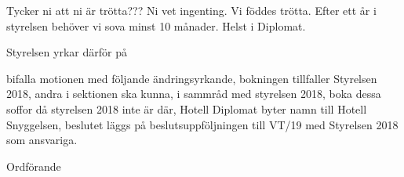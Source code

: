 \documentclass[../_main/handlingar.tex]{subfiles}
\begin{document}
\motionssvar
Tycker ni att ni är trötta??? Ni vet ingenting. Vi föddes trötta. Efter ett år i styrelsen behöver vi sova minst 10 månader. Helst i Diplomat.

Styrelsen yrkar därför på

\begin{attsatser}
	\att bifalla motionen med följande ändringsyrkande,
	\att bokningen tillfaller Styrelsen 2018,
	\att andra i sektionen ska kunna, i sammråd med styrelsen 2018, boka dessa
  soffor då styrelsen 2018 inte är där,
  \att Hotell Diplomat byter namn till Hotell Snyggelsen,
  \att beslutet läggs på beslutsuppföljningen till VT/19 med Styrelsen 2018 som ansvariga.

\end{attsatser}


\begin{signatures}{1}
	\ist
	\signature{Daniel Bakic}{Ordförande}
\end{signatures}
\end{document}
